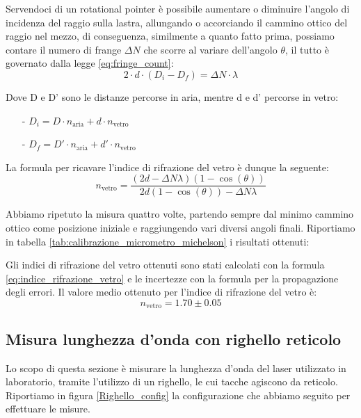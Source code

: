 \documentclass[letterpaper,12pt]{article}
\begin{document}
 Servendoci di un rotational pointer è possibile
aumentare o diminuire l'angolo di incidenza del raggio sulla lastra, allungando o accorciando il cammino ottico 
del raggio nel mezzo, di conseguenza, similmente a quanto fatto prima, possiamo contare il numero di frange $\Delta N$ che scorre 
al variare dell'angolo $\theta$, il tutto è governato dalla legge \eqref{eq:fringe_count}:
\begin{equation}
2 \cdot d \cdot (D_i - D_f) = \Delta N \cdot \lambda
\label{eq:fringe_count}
\end{equation}

Dove D e D' sono le distanze percorse in aria, mentre d e d' percorse in vetro:
\begin{itemize}
    \item[-] $D_i = D \cdot n_\text{aria} + d \cdot n_\text{vetro}$
    \item[-] $D_f = D' \cdot n_\text{aria} + d' \cdot n_\text{vetro}$
\end{itemize} 

La formula per ricavare l'indice di rifrazione del vetro è dunque la seguente:
\begin{equation}
    n_\text{vetro} = \frac{(2d -\Delta N \lambda)(1-\cos(\theta))}{2d (1-\cos(\theta)) - \Delta N \lambda}
    \label{eq:indice_rifrazione_vetro}
\end{equation}

Abbiamo ripetuto la misura quattro volte, partendo sempre dal minimo cammino ottico come posizione iniziale
e raggiungendo vari diversi angoli finali. Riportiamo in tabella \ref{tab:calibrazione_micrometro_michelson} i risultati ottenuti:


Gli indici di rifrazione del vetro ottenuti sono stati calcolati con la formula \ref{eq:indice_rifrazione_vetro} e le incertezze
con la formula per la propagazione degli errori. Il valore medio ottenuto per l'indice di rifrazione del vetro è:
$$ n_\text{vetro} = 1.70 \pm 0.05$$


\subsection{Misura lunghezza d'onda con righello reticolo}

Lo scopo di questa sezione è misurare la lunghezza d'onda del laser utilizzato in laboratorio, tramite l'utilizzo 
di un righello, le cui tacche agiscono da reticolo. Riportiamo in figura \ref{Righello_config} la configurazione
che abbiamo seguito per effettuare le misure.
\end{document}
